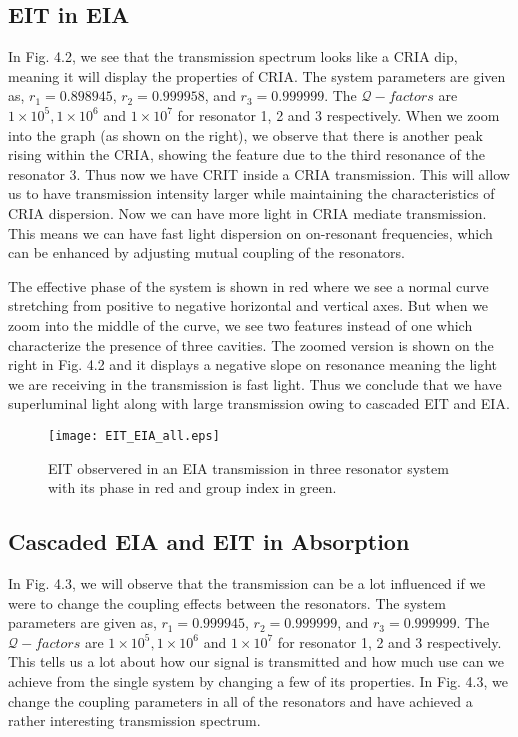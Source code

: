 \subsection{EIT in EIA}
In Fig. 4.2, we see that the transmission spectrum looks like a CRIA dip, meaning it will display the properties of CRIA. The system parameters are given as, $r_{1} = 0.898945$, $r_{2} = 0.999958$, and $r_{3} = 0.999999$. The $\mathcal{Q}-factors$ are $1\times10^{5}, 1\times10^{6}$ and $1\times10^{7}$ for resonator 1, 2 and 3 respectively. When we zoom into the graph (as shown on the right), we observe that there is another peak rising within the CRIA, showing the feature due to the third resonance of the resonator 3. Thus now we have CRIT inside a CRIA transmission. This will allow us to have transmission intensity larger while maintaining the characteristics of CRIA dispersion. Now we can have more light in CRIA mediate transmission. This means we can have fast light dispersion on on-resonant frequencies, which can be enhanced by adjusting mutual coupling of the resonators.

The effective phase of the system is shown in red where we see a normal curve stretching from positive to negative horizontal and vertical axes. But when we zoom into the middle of the curve, we see two features instead of one which characterize the presence of three cavities. The zoomed version is shown on the right in Fig. 4.2 and it displays a negative slope on resonance meaning the light we are receiving in the transmission is fast light. Thus we conclude that we have superluminal light along with large transmission owing to cascaded EIT and EIA.

\begin{figure}[t]
\centering
\texttt{[image: EIT\_EIA\_all.eps]}
\caption{EIT observered in an EIA transmission in three resonator system with its phase in red and group index in green.}
\end{figure}

\newpage
\subsection{Cascaded EIA and EIT in Absorption}
In Fig. 4.3, we will observe that the transmission can be a lot influenced if we were to change the coupling effects between the resonators. The system parameters are given as, $r_{1} = 0.999945$, $r_{2} = 0.999999$, and $r_{3} = 0.999999$. The $\mathcal{Q}-factors$ are $1\times10^{5}, 1\times10^{6}$ and $1\times10^{7}$ for resonator 1, 2 and 3 respectively. This tells us a lot about how our signal is transmitted and how much use can we achieve from the single system by changing a few of its properties. In Fig. 4.3, we change the coupling parameters in all of the resonators and have achieved a rather interesting transmission spectrum.

